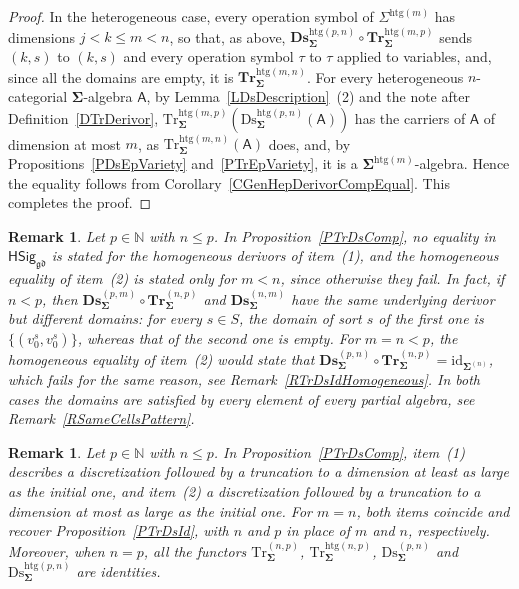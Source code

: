 \documentclass[a4paper, reqno]{amsbook}
\newcommand{\sig}[1]{\mathbf{#1}}             %
\newcommand{\calg}[1]{\boldsymbol{\mathsf{#1}}} %
\newcommand{\gd}{\mathfrak{gd}}              %
\newcommand{\htg}{\mathrm{htg}}                %
\newcommand{\id}{\mathrm{id}}
\newcommand{\Ds}{\mathrm{Ds}}
\newcommand{\Tr}{\mathrm{Tr}}
\newcommand{\bDs}{\mathbf{Ds}}
\newcommand{\bTr}{\mathbf{Tr}}
\theoremstyle{plain}
\newtheorem{remark}[theorem]{Remark}
\theoremstyle{definition}
\begin{document}
\begin{proof}
In the heterogeneous case, every operation symbol of $\Sigma^{\htg(m)}$ has dimensions $j<k\leq m<n$, so that, as above, $\bDs^{\htg(p,n)}_{\sig{\Sigma}}\circ\bTr^{\htg(m,p)}_{\sig{\Sigma}}$ sends $(k,s)$ to $(k,s)$ and every operation symbol $\tau$ to $\tau$ applied to variables, and, since all the domains are empty, it is $\bTr^{\htg(m,n)}_{\sig{\Sigma}}$.
For every heterogeneous $n$-categorial $\sig{\Sigma}$-algebra $\calg{A}$, by Lemma~\ref{LDsDescription}~(2) and the note after Definition~\ref{DTrDerivor}, $\Tr^{\htg(m,p)}_{\sig{\Sigma}}(\Ds^{\htg(p,n)}_{\sig{\Sigma}}(\calg{A}))$ has the carriers of $\calg{A}$ of dimension at most $m$, as $\Tr^{\htg(m,n)}_{\sig{\Sigma}}(\calg{A})$ does, and, by Propositions~\ref{PDsEpVariety} and~\ref{PTrEpVariety}, it is a $\sig{\Sigma}^{\htg(m)}$-algebra.
Hence the equality follows from Corollary~\ref{CGenHepDerivorCompEqual}. This completes the proof.
\end{proof}

\begin{remark}\label{RTrDsCompHomogeneous}
Let $p\in\mathbb{N}$ with $n\leq p$.
In Proposition~\ref{PTrDsComp}, no equality in $\mathsf{HSig}_{\gd}$ is stated for the homogeneous derivors of item~(1), and the homogeneous equality of item~(2) is stated only for $m<n$, since otherwise they fail.
In fact, if $n<p$, then $\bDs^{(p,m)}_{\sig{\Sigma}}\circ\bTr^{(n,p)}_{\sig{\Sigma}}$ and $\bDs^{(n,m)}_{\sig{\Sigma}}$ have the same underlying derivor but different domains: for every $s\in S$, the domain of sort $s$ of the first one is $\{(v^s_0,v^s_0)\}$, whereas that of the second one is empty.
For $m=n<p$, the homogeneous equality of item~(2) would state that $\bDs^{(p,n)}_{\sig{\Sigma}}\circ\bTr^{(n,p)}_{\sig{\Sigma}}=\id_{\sig{\Sigma}^{(n)}}$, which fails for the same reason, see Remark~\ref{RTrDsIdHomogeneous}.
In both cases the domains are satisfied by every element of every partial algebra, see Remark~\ref{RSameCellsPattern}.
\end{remark}

\begin{remark}\label{RTrDsCompOverlap}
Let $p\in\mathbb{N}$ with $n\leq p$.
In Proposition~\ref{PTrDsComp}, item~(1) describes a discretization followed by a truncation to a dimension at least as large as the initial one, and item~(2) a discretization followed by a truncation to a dimension at most as large as the initial one.
For $m=n$, both items coincide and recover Proposition~\ref{PTrDsId}, with $n$ and $p$ in place of $m$ and $n$, respectively.
Moreover, when $n=p$, all the functors $\Tr^{(n,p)}_{\sig{\Sigma}}$, $\Tr^{\htg(n,p)}_{\sig{\Sigma}}$, $\Ds^{(p,n)}_{\sig{\Sigma}}$ and $\Ds^{\htg(p,n)}_{\sig{\Sigma}}$ are identities.
\end{remark}
\end{document}
